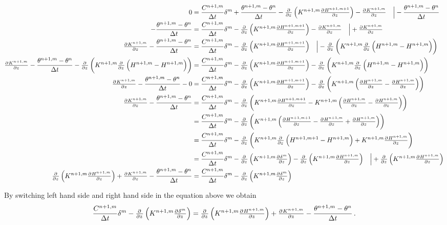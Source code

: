 \begin{landscape}
  \begin{align*}
    0 &= \frac{C^{n+1,m}}{\Delta t} \delta^m + \frac{\theta^{n+1,m} - \theta^n}{\Delta t} - \pd{}{z} \del{ K^{n+1,m}\pd{H^{n+1,m+1}}{z} } - \pd{K^{n+1,m}}{z} \quad \Bigr\rvert - \frac{\theta^{n+1,m} - \theta^n}{\Delta t} \\
    - \frac{\theta^{n+1,m} - \theta^n}{\Delta t} &= \frac{C^{n+1,m}}{\Delta t} \delta^m - \pd{}{z} \del{ K^{n+1,m}\pd{H^{n+1,m+1}}{z} } - \pd{K^{n+1,m}}{z} \quad \Bigr\rvert + \pd{K^{n+1,m}}{z} \\
    \pd{K^{n+1,m}}{z} - \frac{\theta^{n+1,m} - \theta^n}{\Delta t} &= \frac{C^{n+1,m}}{\Delta t} \delta^m - \pd{}{z} \del{ K^{n+1,m}\pd{H^{n+1,m+1}}{z} } \quad \Bigr\rvert - \pd{}{z} \del{ K^{n+1,m}\pd{}{z}\del{ H^{n+1,m} - H^{n+1,m} } } \\
    \pd{K^{n+1,m}}{z} - \frac{\theta^{n+1,m} - \theta^n}{\Delta t} - \pd{}{z} \del{ K^{n+1,m}\pd{}{z}\del{ H^{n+1,m} - H^{n+1,m} } } &= \frac{C^{n+1,m}}{\Delta t} \delta^m - \pd{}{z} \del{ K^{n+1,m}\pd{H^{n+1,m+1}}{z} } - \pd{}{z} \del{ K^{n+1,m}\pd{}{z}\del{ H^{n+1,m} - H^{n+1,m} } } \\
    \pd{K^{n+1,m}}{z} - \frac{\theta^{n+1,m} - \theta^n}{\Delta t} - 0 &= \frac{C^{n+1,m}}{\Delta t} \delta^m - \pd{}{z} \del{ K^{n+1,m}\pd{H^{n+1,m+1}}{z} } - \pd{}{z} \del{ K^{n+1,m}\del{ \pd{H^{n+1,m}}{z} - \pd{H^{n+1,m}}{z} } } \\
    \pd{K^{n+1,m}}{z} - \frac{\theta^{n+1,m} - \theta^n}{\Delta t} &= \frac{C^{n+1,m}}{\Delta t} \delta^m - \pd{}{z} \del{ K^{n+1,m}\pd{H^{n+1,m+1}}{z} - K^{n+1,m}\del{ \pd{H^{n+1,m}}{z} - \pd{H^{n+1,m}}{z} } } \\
      &= \frac{C^{n+1,m}}{\Delta t} \delta^m - \pd{}{z} \del{ K^{n+1,m} \del{ \pd{H^{n+1,m+1}}{z} - \pd{H^{n+1,m}}{z} + \pd{H^{n+1,m}}{z} } } \\
      &= \frac{C^{n+1,m}}{\Delta t} \delta^m - \pd{}{z} \del{ K^{n+1,m} \pd{}{z} \del{ H^{n+1,m+1} - H^{n+1,m} } + K^{n+1,m} \pd{H^{n+1,m}}{z} } \\
      &= \frac{C^{n+1,m}}{\Delta t} \delta^m - \pd{}{z} \del{ K^{n+1,m} \pd{\delta^m}{z} } - \pd{}{z} \del{ K^{n+1,m} \pd{H^{n+1,m}}{z} } \quad \Bigr\rvert + \pd{}{z} \del{ K^{n+1,m} \pd{H^{n+1,m}}{z} } \\
    \pd{}{z} \del{ K^{n+1,m} \pd{H^{n+1,m}}{z} } + \pd{K^{n+1,m}}{z} - \frac{\theta^{n+1,m} - \theta^n}{\Delta t} &= \frac{C^{n+1,m}}{\Delta t} \delta^m - \pd{}{z} \del{ K^{n+1,m} \pd{\delta^m}{z} }
  \end{align*}
\end{landscape}
\newpage
By switching left hand side and right hand side in the equation above we obtain \parencite{celia_general_1990}
\begin{equation}
  \label{eq:celia_16}
  \frac{C^{n+1,m}}{\Delta t} \delta^m - \pd{}{z} \del{ K^{n+1,m} \pd{\delta^m}{z} } = \pd{}{z} \del{ K^{n+1,m} \pd{H^{n+1,m}}{z} } + \pd{K^{n+1,m}}{z} - \frac{\theta^{n+1,m} - \theta^n}{\Delta t} \, .
\end{equation}

